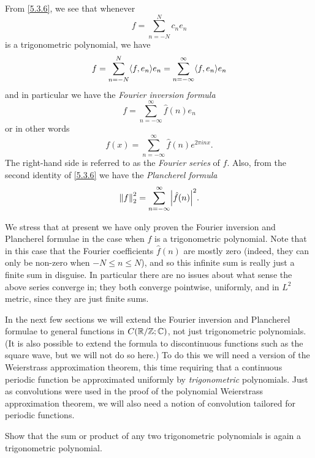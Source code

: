 \begin{ac}\label{ac:5.3.1}
  From \cref{5.3.6}, we see that whenever
  \[
    f = \sum_{n = -N}^N c_n e_n
  \]
  is a trigonometric polynomial, we have
  \[
    f = \sum_{n = -N}^N \inner*{f, e_n} e_n = \sum_{n = -\infty}^\infty \inner*{f, e_n} e_n
  \]
  and in particular we have the \emph{Fourier inversion formula}
  \[
    f = \sum_{n = -\infty}^\infty \hat{f}(n) e_n
  \]
  or in other words
  \[
    f(x) = \sum_{n = -\infty}^\infty \hat{f}(n) e^{2 \pi i n x}.
  \]
  The right-hand side is referred to as the \emph{Fourier series} of \(f\).
  Also, from the second identity of \cref{5.3.6} we have the \emph{Plancherel formula}
  \[
    \norm*{f}_2^2 = \sum_{n = -\infty}^\infty \abs{\hat{f}(n)}^2.
  \]
\end{ac}

\begin{rmk}\label{5.3.8}
  We stress that at present we have only proven the Fourier inversion and Plancherel formulae in the case when \(f\) is a trigonometric polynomial.
  Note that in this case that the Fourier coefficients \(\hat{f}(n)\) are mostly zero (indeed, they can only be non-zero when \(-N \leq n \leq N\)), and so this infinite sum is really just a finite sum in disguise.
  In particular there are no issues about what sense the above series converge in;
  they both converge pointwise, uniformly, and in \(L^2\) metric, since they are just finite sums.
\end{rmk}

\begin{note}
  In the next few sections we will extend the Fourier inversion and Plancherel formulae to general functions in \(C(\mathbb{R} / \mathbb{Z} ; \mathbb{C})\), not just trigonometric polynomials.
  (It is also possible to extend the formula to discontinuous functions such as the square wave, but we will not do so here.)
  To do this we will need a version of the Weierstrass approximation theorem, this time requiring that a continuous periodic function be approximated uniformly by \emph{trigonometric} polynomials.
  Just as convolutions were used in the proof of the polynomial Weierstrass approximation theorem, we will also need a notion of convolution tailored for periodic functions.
\end{note}

\exercisesection

\begin{ex}\label{ex:5.3.1}
  Show that the sum or product of any two trigonometric polynomials is again a trigonometric polynomial.
\end{ex}

